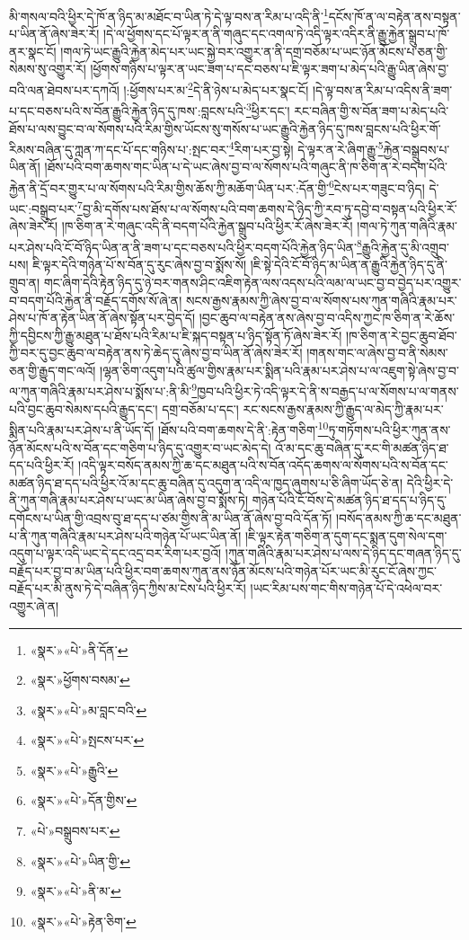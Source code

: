 མི་གསལ་བའི་ཕྱིར་དེ་ཁོ་ན་ཉིད་མ་མཐོང་བ་ཡིན་ཏེ་དེ་ལྟ་བས་ན་རིམ་པ་འདི་ནི་\footnote{«སྣར་»«པེ་»ནི་དོན་}དངོས་ཁོ་ན་ལ་བརྟེན་ནས་བསྟན་པ་ཡིན་ནོ་ཞེས་ཟེར་རོ། །དེ་ལ་ཕྱོགས་དང་པོ་ལྟར་ན་ནི་གཞུང་དང་འགལ་ཏེ་འདི་ལྟར་འདིར་ནི་རྒྱུ་རྐྱེན་སྒྲུབ་པ་ཁོ་ནར་སྣང་ངོ། །གལ་ཏེ་ཡང་རྒྱུའི་རྐྱེན་མེད་པར་ཡང་སྐྱེ་བར་འགྱུར་ན་ནི་དགྲ་བཅོམ་པ་ཡང་ཉོན་མོངས་པ་ཅན་གྱི་སེམས་སུ་འགྱུར་རོ། །ཕྱོགས་གཉིས་པ་ལྟར་ན་ཡང་ཟག་པ་དང་བཅས་པ་ཇི་ལྟར་ཟག་པ་མེད་པའི་རྒྱུ་ཡིན་ཞེས་བྱ་བའི་ལན་ཐེབས་པར་དཀའོ། །:ཕྱོགས་པར་མ་\footnote{«སྣར་»ཕྱོགས་བསམ་}དེ་ནི་ཉེས་པ་མེད་པར་སྣང་ངོ། །དེ་ལྟ་བས་ན་རིམ་པ་འདིས་ནི་ཟག་པ་དང་བཅས་པའི་ས་བོན་རྒྱུའི་རྐྱེན་ཉིད་དུ་ཁས་:བླངས་པའི་\footnote{«སྣར་»«པེ་»མ་བླང་བའི་}ཕྱིར་དང་། རང་བཞིན་གྱི་ས་བོན་ཟག་པ་མེད་པའི་ཐོས་པ་ལས་བྱུང་བ་ལ་སོགས་པའི་རིམ་གྱིས་ཡོངས་སུ་གསོས་པ་ཡང་རྒྱུའི་རྐྱེན་ཉིད་དུ་ཁས་བླངས་པའི་ཕྱིར་གོ་རིམས་བཞིན་དུ་ཀླན་ཀ་དང་པོ་དང་གཉིས་པ་:སྤང་བར་\footnote{«སྣར་»«པེ་»སྤངས་པར་}རིག་པར་བྱ་སྟེ། དེ་ལྟར་ན་རེ་ཞིག་རྒྱུ་\footnote{«སྣར་»«པེ་»རྒྱུའི་}རྐྱེན་བསྒྲུབས་པ་ཡིན་ནོ། །ཐོས་པའི་བག་ཆགས་གང་ཡིན་པ་དེ་ཡང་ཞེས་བྱ་བ་ལ་སོགས་པའི་གཞུང་ནི་ཁ་ཅིག་ན་རེ་བདག་པོའི་རྐྱེན་ནི་དྲོ་བར་གྱུར་པ་ལ་སོགས་པའི་རིམ་གྱིས་ཆོས་ཀྱི་མཆོག་ཡིན་པར་:དོན་གྱི་\footnote{«སྣར་»«པེ་»དོན་གྱིས་}ངེས་པར་གཟུང་བ་ཉིད། དེ་ཡང་:བསྒྲུབ་པར་\footnote{«པེ་»བསྒྲུབས་པར་}བྱ་མི་དགོས་པས་ཐོས་པ་ལ་སོགས་པའི་བག་ཆགས་དེ་ཉིད་ཀྱི་རབ་ཏུ་དབྱེ་བ་བསྟན་པའི་ཕྱིར་རོ་ཞེས་ཟེར་རོ། །ཁ་ཅིག་ན་རེ་གཞུང་འདི་ནི་བདག་པོའི་རྐྱེན་སྒྲུབ་པའི་ཕྱིར་རོ་ཞེས་ཟེར་རོ། །གལ་ཏེ་ཀུན་གཞིའི་རྣམ་པར་ཤེས་པའི་ངོ་བོ་ཉིད་ཡིན་ན་ནི་ཟག་པ་དང་བཅས་པའི་ཕྱིར་བདག་པོའི་རྐྱེན་ཉིད་ཡིན་\footnote{«སྣར་»«པེ་»ཡིན་གྱི་}རྒྱུའི་རྐྱེན་དུ་མི་འགྲུབ་པས། ཇི་ལྟར་དེའི་གཉེན་པོ་ས་བོན་དུ་རུང་ཞེས་བྱ་བ་སྨོས་སོ། །ཇི་སྟེ་དེའི་ངོ་བོ་ཉིད་མ་ཡིན་ན་རྒྱུའི་རྐྱེན་ཉིད་དུ་ནི་གྲུབ་ན། གང་ཞིག་དེའི་རྟེན་ཉིད་དུ་ཉེ་བར་གནས་ཤིང་འཇིག་རྟེན་ལས་འདས་པའི་ལམ་ལ་ཡང་བྱ་བ་བྱེད་པར་འགྱུར་བ་བདག་པོའི་རྐྱེན་ནི་བརྗོད་དགོས་སོ་ཞེ་ན། སངས་རྒྱས་རྣམས་ཀྱི་ཞེས་བྱ་བ་ལ་སོགས་པས་ཀུན་གཞིའི་རྣམ་པར་ཤེས་པ་ཁོ་ན་རྟེན་ཡིན་ནོ་ཞེས་སྟོན་པར་བྱེད་དོ། །བྱང་ཆུབ་ལ་བརྟེན་ནས་ཞེས་བྱ་བ་འདིས་ཀྱང་ཁ་ཅིག་ན་རེ་ཆོས་ཀྱི་དབྱིངས་ཀྱི་རྒྱུ་མཐུན་པ་ཐོས་པའི་རིམ་པ་ཇི་སྐད་བསྟན་པ་ཉིད་སྟོན་ཏོ་ཞེས་ཟེར་རོ། །ཁ་ཅིག་ན་རེ་བྱང་ཆུབ་ཐོབ་ཀྱི་བར་དུ་བྱང་ཆུབ་ལ་བརྟེན་ནས་ཏེ་ཆེད་དུ་ཞེས་བྱ་བ་ཡིན་ནོ་ཞེས་ཟེར་རོ། །གནས་གང་ལ་ཞེས་བྱ་བ་ནི་སེམས་ཅན་གྱི་རྒྱུད་གང་ལའོ། །ལྷན་ཅིག་འདུག་པའི་ཚུལ་གྱིས་རྣམ་པར་སྨིན་པའི་རྣམ་པར་ཤེས་པ་ལ་འཇུག་སྟེ་ཞེས་བྱ་བ་ལ་ཀུན་གཞིའི་རྣམ་པར་ཤེས་པ་སྨོས་པ་:ནི་མི་\footnote{«སྣར་»«པེ་»ནི་མ་}ཁྱབ་པའི་ཕྱིར་ཏེ་འདི་ལྟར་དེ་ནི་ས་བརྒྱད་པ་ལ་སོགས་པ་ལ་གནས་པའི་བྱང་ཆུབ་སེམས་དཔའི་རྒྱུད་དང་། དགྲ་བཅོམ་པ་དང་། རང་སངས་རྒྱས་རྣམས་ཀྱི་རྒྱུད་ལ་མེད་ཀྱི་རྣམ་པར་སྨིན་པའི་རྣམ་པར་ཤེས་པ་ནི་ཡོད་དོ། །ཐོས་པའི་བག་ཆགས་དེ་ནི་:རྟེན་གཅིག་\footnote{«སྣར་»«པེ་»རྟེན་ཅིག་}ཏུ་གཏོགས་པའི་ཕྱིར་ཀུན་ནས་ཉོན་མོངས་པའི་ས་བོན་དང་གཅིག་པ་ཉིད་དུ་འགྱུར་བ་ཡང་མེད་དེ། འོ་མ་དང་ཆུ་བཞིན་དུ་རང་གི་མཚན་ཉིད་ཐ་དད་པའི་ཕྱིར་རོ། །འདི་ལྟར་བསོད་ནམས་ཀྱི་ཆ་དང་མཐུན་པའི་ས་བོན་འདོད་ཆགས་ལ་སོགས་པའི་ས་བོན་དང་མཚན་ཉིད་ཐ་དད་པའི་ཕྱིར་འོ་མ་དང་ཆུ་བཞིན་དུ་འདུག་ན་འདི་ལ་ཁྱད་ཞུགས་པ་ཅི་ཞིག་ཡོད་ཅེ་ན། དེའི་ཕྱིར་དེ་ནི་ཀུན་གཞི་རྣམ་པར་ཤེས་པ་ཡང་མ་ཡིན་ཞེས་བྱ་བ་སྨོས་ཏེ། གཉེན་པོའི་ངོ་བོས་དེ་མཚན་ཉིད་ཐ་དད་པ་ཉིད་དུ་དགོངས་པ་ཡིན་གྱི་འབྲས་བུ་ཐ་དད་པ་ཙམ་གྱིས་ནི་མ་ཡིན་ནོ་ཞེས་བྱ་བའི་དོན་ཏོ། །བསོད་ནམས་ཀྱི་ཆ་དང་མཐུན་པ་ནི་ཀུན་གཞིའི་རྣམ་པར་ཤེས་པའི་གཉེན་པོ་ཡང་ཡིན་ནོ། །ཇི་ལྟར་རྟེན་གཅིག་ན་དུག་དང་སྨན་དུག་སེལ་དག་འདུག་པ་ལྟར་འདི་ཡང་དེ་དང་འདྲ་བར་རིག་པར་བྱའོ། །ཀུན་གཞིའི་རྣམ་པར་ཤེས་པ་ལས་དེ་ཉིད་དང་གཞན་ཉིད་དུ་བརྗོད་པར་བྱ་བ་མ་ཡིན་པའི་ཕྱིར་བག་ཆགས་ཀུན་ནས་ཉོན་མོངས་པའི་གཉེན་པོར་ཡང་མི་རུང་ངོ་ཞེས་ཀྱང་བརྗོད་པར་མི་ནུས་ཏེ་དེ་བཞིན་ཉིད་ཀྱིས་མ་ངེས་པའི་ཕྱིར་རོ། །ཡང་རིམ་པས་གང་གིས་གཉེན་པོ་དེ་འཕེལ་བར་འགྱུར་ཞེ་ན། 